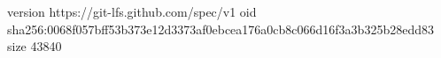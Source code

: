 version https://git-lfs.github.com/spec/v1
oid sha256:0068f057bff53b373e12d3373af0ebcea176a0cb8c066d16f3a3b325b28edd83
size 43840
